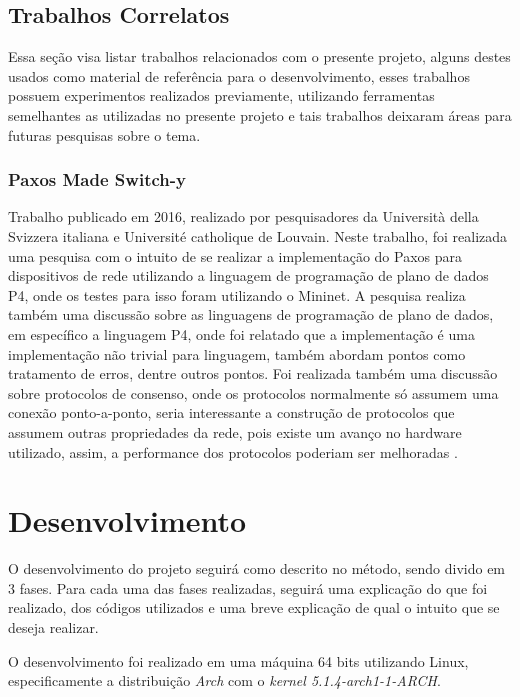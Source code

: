 \documentclass[
    12pt,
    openright, 
    oneside,
    a4paper,
    french,
    english,
    brazil
    ]{facom-ufu-abntex2}
\theoremstyle{definition}
\begin{document}
\section{Trabalhos Correlatos}
Essa seção visa listar trabalhos relacionados com o presente projeto, alguns destes usados
como material de referência para o desenvolvimento, esses trabalhos possuem experimentos
realizados previamente, utilizando ferramentas semelhantes as utilizadas no presente projeto 
e tais trabalhos deixaram áreas para futuras pesquisas sobre o tema.

\subsection{Paxos Made Switch-y}
Trabalho publicado em 2016, realizado por pesquisadores da Università della Svizzera italiana
e Université catholique de Louvain. Neste trabalho, foi realizada uma pesquisa com o intuito
de se realizar a implementação do Paxos para dispositivos de rede utilizando a linguagem
de programação de plano de dados P4, onde os testes para isso foram utilizando o Mininet. 
A pesquisa realiza também uma discussão sobre as linguagens de programação de plano de dados,
em específico a linguagem P4, onde foi relatado que a implementação é uma
implementação não trivial para linguagem, também abordam pontos como tratamento de erros,
dentre outros pontos. Foi realizada também uma discussão sobre protocolos de consenso,
onde os protocolos normalmente só assumem uma conexão ponto-a-ponto, seria interessante a
construção de protocolos que assumem outras propriedades da rede, pois existe um avanço
no hardware utilizado, assim, a performance dos protocolos poderiam ser melhoradas 
\cite{dang2016paxos}.

\chapter{Desenvolvimento}
O desenvolvimento do projeto seguirá como descrito no método, sendo divido em 
3 fases. Para cada uma das fases realizadas, seguirá uma explicação do que foi realizado,
dos códigos utilizados e uma breve explicação de qual o intuito que se deseja realizar.

O desenvolvimento foi realizado em uma máquina 64 bits utilizando Linux, especificamente a 
distribuição \emph{Arch} com o \emph{kernel 5.1.4-arch1-1-ARCH}.
\end{document}
